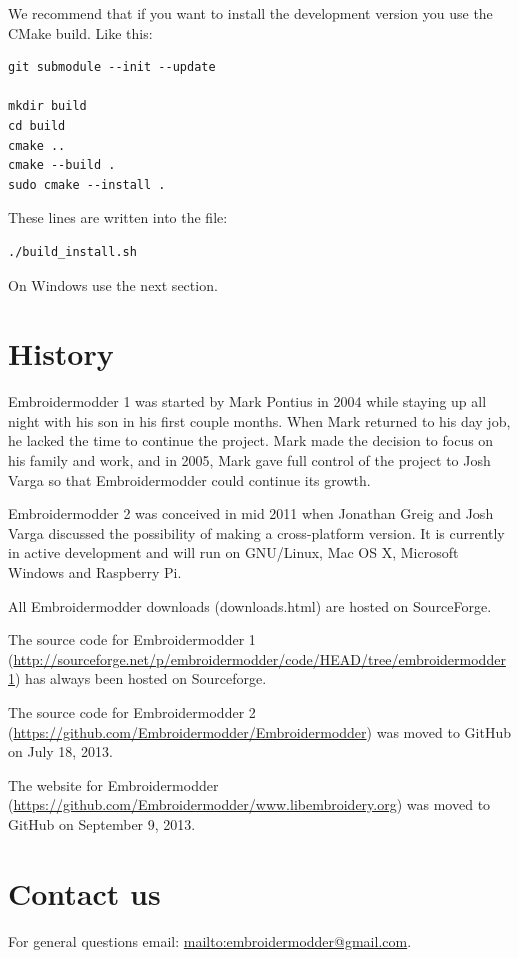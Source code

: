 \documentclass[11pt]{report}
\begin{document}
We recommend that if you want to install the development version you use the CMake build. Like
this:

\begin{lstlisting}
git submodule --init --update

mkdir build
cd build
cmake ..
cmake --build .
sudo cmake --install .
\end{lstlisting}

These lines are written into the file:

\begin{lstlisting}
./build_install.sh
\end{lstlisting}

On Windows use the next section.

\section{History}

Embroidermodder 1 was started by Mark Pontius in 2004 while staying up all night
with his son in his first couple months. When Mark returned to his day job, he
lacked the time to continue the project. Mark made the decision to focus on his
family and work, and in 2005, Mark gave full control of the project to Josh
Varga so that Embroidermodder could continue its growth.

Embroidermodder 2 was conceived in mid 2011 when Jonathan Greig and Josh Varga
discussed the possibility of making a cross-platform version. It is currently in
active development and will run on GNU/Linux, Mac OS X, Microsoft Windows and
Raspberry Pi.

All Embroidermodder downloads (downloads.html) are hosted on SourceForge.

The source code for Embroidermodder 1
(\url{http://sourceforge.net/p/embroidermodder/code/HEAD/tree/embroidermodder1})
has always been hosted on Sourceforge.

The source code for Embroidermodder 2
(\url{https://github.com/Embroidermodder/Embroidermodder}) was moved to GitHub
on July 18, 2013.

The website for Embroidermodder
(\url{https://github.com/Embroidermodder/www.libembroidery.org}) was moved to
GitHub on September 9, 2013.

\section{Contact us}

For general questions email: \url{mailto:embroidermodder@gmail.com}.
\end{document}
